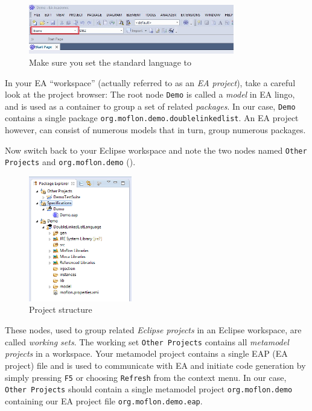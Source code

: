 \begin{figure}[htbp]
    \centering
    \includegraphics[width=0.8\textwidth]{../../org.moflon.doc.handbook.01_installation/4_projectSetup/modelingWithEA/ea_images/standardCodeEngineering2}
    \caption{Make sure you set the standard language to }
    \label{ea:standardSCEEA2}
 \end{figure}
 
\clearpage

In your EA \enquote{workspace} (actually referred to as an \emph{EA project}), take a careful look at the project browser:
The root node \texttt{Demo} is called a \emph{model} in EA lingo, and is used as a container to group a set of related \emph{packages}.
In our case, \texttt{Demo} contains a single package \texttt{org.moflon.demo.doublelinkedlist}.
An EA project however, can consist of numerous models that in turn, group numerous packages.

Now switch back to your Eclipse workspace and note the two nodes named \texttt{Other Projects} and \texttt{org.moflon.demo} ().

\begin{figure}[htbp]
    \centering
    \includegraphics[width=0.4\textwidth]{../../org.moflon.doc.handbook.01_installation/4_projectSetup/modelingWithEA/ea_images/eclipse_visPackageExplorer}
    \caption{Project structure}
    \label{eclipse:eclipsePS}
 \end{figure}

These nodes, used to group related \emph{Eclipse projects} in an Eclipse workspace, are called \emph{working sets}. The working set
\texttt{Other Projects} contains all \emph{metamodel projects} in a  workspace. Your metamodel project contains a single EAP (EA project) file and is
used to communicate with EA and initiate code generation by simply pressing \texttt{F5} or choosing \texttt{Refresh} from the context menu. In our case,
\texttt{Other Projects} should contain a single metamodel project \texttt{org.moflon.demo} containing our EA project file \texttt{org.moflon.demo.eap}.
 
